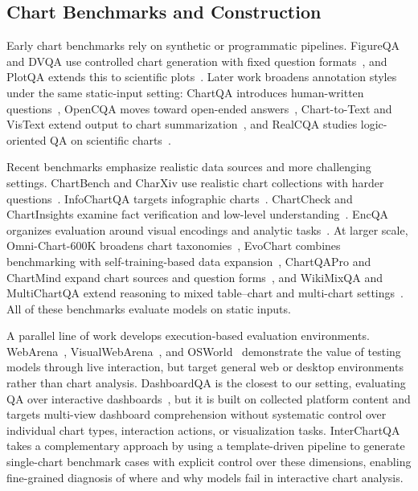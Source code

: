 \documentclass[review,journal,hideappendix]{vgtc} %
\begin{document}
\subsection{Chart Benchmarks and Construction}
Early chart benchmarks rely on synthetic or programmatic pipelines. FigureQA and DVQA use controlled chart generation with fixed question formats~\cite{kahouFigureQAAnnotatedFigure2018a,kafleDVQAUnderstandingData2018}, and PlotQA extends this to scientific plots~\cite{methaniPlotQAReasoningScientific2020}. Later work broadens annotation styles under the same static-input setting: ChartQA introduces human-written questions~\cite{masryChartQABenchmarkQuestion2022}, OpenCQA moves toward open-ended answers~\cite{kantharajOpenCQAOpenended2022}, Chart-to-Text and VisText extend output to chart summarization~\cite{kantharajCharttoTextLargescale2022,tangVisTextBenchmark2023}, and RealCQA studies logic-oriented QA on scientific charts~\cite{ahmedRealCQAScientificChart2023}.

Recent benchmarks emphasize realistic data sources and more challenging settings. ChartBench and CharXiv use realistic chart collections with harder questions~\cite{xuChartBenchBenchmarkComplex2024,wangCharXivChartingGaps2024}. InfoChartQA targets infographic charts~\cite{xieInfoChartQABenchmarkMultimodal2025a}. ChartCheck and ChartInsights examine fact verification and low-level understanding~\cite{akhtarChartCheckExplainable2024,wuChartInsightsEvaluating2024}. EncQA organizes evaluation around visual encodings and analytic tasks~\cite{mukherjeeEncQABenchmarkingVisionlanguage2025}. At larger scale, Omni-Chart-600K broadens chart taxonomies~\cite{wangOmnichart600KComprehensiveDataset2025}, EvoChart combines benchmarking with self-training-based data expansion~\cite{huangEvoChartBenchmarkSelftraining2025}, ChartQAPro and ChartMind expand chart sources and question forms~\cite{masryChartQAProMoreDiverse2025,weiChartMindComprehensiveBenchmark2025}, and WikiMixQA and MultiChartQA extend reasoning to mixed table--chart and multi-chart settings~\cite{foroutanWikiMixQAMultimodalBenchmark2025a,zhuMultiChartQABenchmarkingVisionlanguage2025}. All of these benchmarks evaluate models on static inputs.

A parallel line of work develops execution-based evaluation environments. WebArena~\cite{zhouWebArenaRealisticWeb2023}, VisualWebArena~\cite{kohVisualWebArenaEvaluating2024}, and OSWorld~\cite{xieOSWorldBenchmarkingMultimodal2024} demonstrate the value of testing models through live interaction, but target general web or desktop environments rather than chart analysis. DashboardQA is the closest to our setting, evaluating QA over interactive dashboards~\cite{karthaDashboardQABenchmarkingMultimodal2025}, but it is built on collected platform content and targets multi-view dashboard comprehension without systematic control over individual chart types, interaction actions, or visualization tasks. InterChartQA takes a complementary approach by using a template-driven pipeline to generate single-chart benchmark cases with explicit control over these dimensions, enabling fine-grained diagnosis of where and why models fail in interactive chart analysis.
\end{document}
